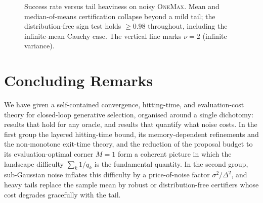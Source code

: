 \documentclass[11pt,a4paper]{article}
\begin{document}
\begin{figure}[ht]
\centering
{}
\caption{Success rate versus tail heaviness on noisy \textsc{OneMax}.  Mean
  and median-of-means certification collapse beyond a mild tail; the
  distribution-free sign test holds $\ge0.98$ throughout, including the
  infinite-mean Cauchy case.  The vertical line marks $\nu=2$ (infinite
  variance).}
\label{fig:ht-succ}
\end{figure}

\section{Concluding Remarks}
\label{sec:concl}

We have given a self-contained convergence, hitting-time, and
evaluation-cost theory for closed-loop generative selection, organised
around a single dichotomy: results that hold for any oracle, and results
that quantify what noise costs.  In the first group the layered
hitting-time bound, its memory-dependent refinements and the
non-monotone exit-time theory, and the reduction of the proposal budget to
its evaluation-optimal corner $M=1$ form a coherent picture in which the
landscape difficulty $\sum_k 1/q_k$ is the fundamental quantity.  In the
second group, sub-Gaussian noise inflates this difficulty by a
price-of-noise factor $\sigma^2/\Delta^2$, and heavy tails replace the
sample mean by robust or distribution-free certifiers whose cost degrades
gracefully with the tail.
\end{document}
